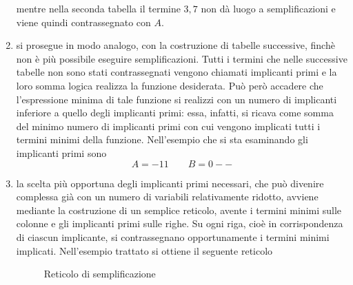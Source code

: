 \documentclass[a4paper]{extarticle}
\begin{document}
\begin{enumerate}
  \noindent
  mentre nella seconda tabella il termine $3,7$ non dà luogo a semplificazioni e viene quindi contrassegnato con $A$.
  \item si prosegue in modo analogo, con la costruzione di tabelle successive, finchè non è più possibile eseguire semplificazioni. Tutti i termini che nelle successive tabelle non sono stati contrassegnati vengono chiamati implicanti primi e la loro somma logica realizza la funzione desiderata. Può però accadere che l’espressione minima di tale funzione si realizzi con un numero di implicanti inferiore a quello degli implicanti primi: essa, infatti, si ricava come somma del minimo numero di implicanti primi con cui vengono implicati tutti i termini minimi della funzione. Nell’esempio che si sta esaminando gli implicanti primi sono
  \[A = -11 \hspace{2em} B = 0--\]
  \item la scelta più opportuna degli implicanti primi necessari, che può divenire complessa già con un numero di variabili relativamente ridotto, avviene mediante la costruzione di un semplice reticolo, avente i termini minimi sulle colonne e gli implicanti primi sulle righe. Su ogni riga, cioè in corrispondenza di ciascun implicante, si contrassegnano opportunamente i termini minimi implicati. Nell’esempio trattato si ottiene il seguente reticolo

  \begin{figure}[H]
      \centering
      \caption{Reticolo di semplificazione}
      \label{fig:reticolo_semplificazione_1}
  \end{figure}


\end{enumerate}
\end{document}
